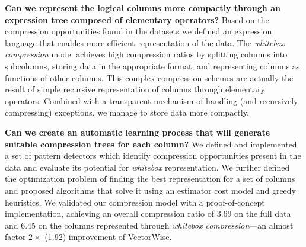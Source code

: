 \textbf{Can we represent the logical columns more compactly through an expression tree composed of elementary operators?} Based on the compression opportunities found in the datasets we defined an expression language that enables more efficient representation of the data. The \textit{whitebox compression} model achieves high compression ratios by splitting columns into subcolumns, storing data in the appropriate format, and representing columns as functions of other columns. This complex compression schemes are actually the result of simple recursive representation of columns through elementary operators. Combined with a transparent mechanism of handling (and recursively compressing) exceptions, we manage to store data more compactly.
\iffalse
\fi

\textbf{Can we create an automatic learning process that will generate suitable compression trees for each column?}
We defined and implemented a set of pattern detectors which identify compression opportunities present in the data and evaluate its potential for \textit{whitebox} representation. We further defined the optimization problem of finding the best representation for a set of columns and proposed algorithms that solve it using an estimator cost model and greedy heuristics. We validated our compression model with a proof-of-concept implementation, achieving an overall compression ratio of 3.69 on the full data and 6.45 on the columns represented through \textit{whitebox compression}---an almost factor \(2\times\) (1.92) improvement of VectorWise.\\
\iffalse
\fi


